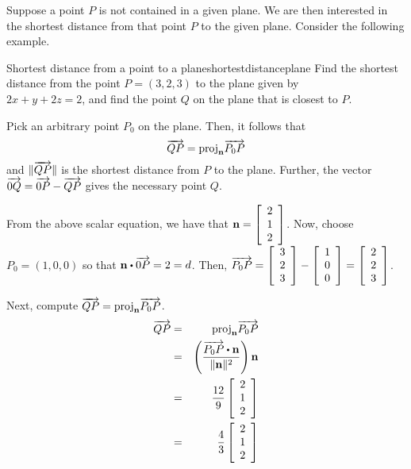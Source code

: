Suppose a point $P$ is not contained in a given plane. We are then interested in the shortest distance from that point $P$ to the given plane. Consider the following example. 

\begin{example}{Shortest distance from a point to a plane}{shortestdistanceplane}
Find the shortest distance from the point $P = (3,2,3)$ to the plane given by \\ $ 2x + y + 2z = 2$, and find the point $Q$ on the plane that is closest to $P$. 
\end{example}

\begin{solution}
Pick an arbitrary point $P_0$ on the plane. Then, it follows that
\[
\overrightarrow{QP} = \mbox{proj}_{{\bf n}}\overrightarrow{P_0P}
\]
and $\| \overrightarrow{QP} \|$ is the shortest distance from $P$ to the plane. Further, the vector $\overrightarrow{0Q} = \overrightarrow{0P} - \overrightarrow{QP}$ gives the necessary point $Q$. 

From the above scalar equation, we have that ${\bf n} = 
\left[
\begin{array}{c}
2 \\
1 \\
2 
\end{array}
\right]$. Now, choose $P_0 = (1, 0, 0)$ so that $\vect{n} \dotprod \longvect{0P} = 2 = d$. 
Then, $\overrightarrow{P_0P} = \left[
\begin{array}{c}
3 \\
2 \\
3
\end{array}
\right]
- 
\left[
\begin{array}{c}
1 \\
0 \\
0
\end{array}
\right]
=
\left[
\begin{array}{c}
2 \\
2 \\
3
\end{array}
\right]$. 

Next, compute $\overrightarrow{QP} = \mbox{proj}_{{\bf n}}\overrightarrow{P_0P}$. 
\begin{eqnarray*}
\longvect{QP} &=& \func{proj}_{\vect{n}}\longvect{P_0P} \\
&=& \left( \frac{ \longvect{P_0P} \dotprod \vect{n}}{\vectlength \vect{n} \vectlength ^2}\right)\vect{n} \\
&=& \frac{12}{9} \leftB
\begin{array}{r}
2 \\
1 \\
2
\end{array}
\rightB \\
&=& \frac{4}{3} \leftB
\begin{array}{r}
2 \\
1 \\
2
\end{array}
\rightB 
\end{eqnarray*}


\end{solution}
